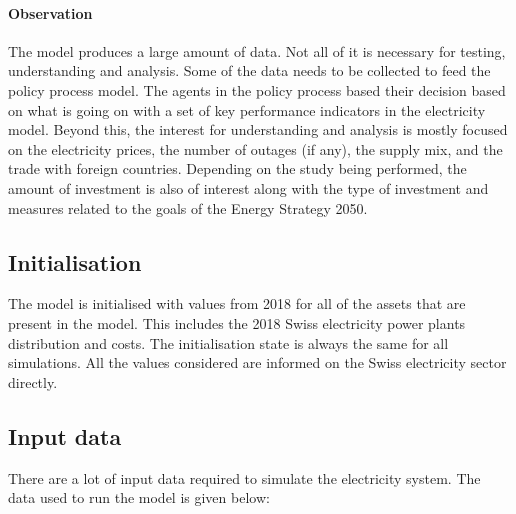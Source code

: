 \paragraph{Observation}

The model produces a large amount of data. Not all of it is necessary for testing, understanding and analysis. Some of the data needs to be collected to feed the policy process model. The agents in the policy process based their decision based on what is going on with a set of key performance indicators in the electricity model. Beyond this, the interest for understanding and analysis is mostly focused on the electricity prices, the number of outages (if any), the supply mix, and the trade with foreign countries. Depending on the study being performed, the amount of investment is also of interest along with the type of investment and measures related to the goals of the Energy Strategy 2050.


\subsection{Initialisation}
\label{sec:initialisation}

The model is initialised with values from 2018 for all of the assets that are present in the model. This includes the 2018 Swiss electricity power plants distribution and costs. The initialisation state is always the same for all simulations. All the values considered are informed on the Swiss electricity sector directly.


\subsection{Input data}
\label{ssec:inputData}

There are a lot of input data required to simulate the electricity system. The data used to run the model is given below:

